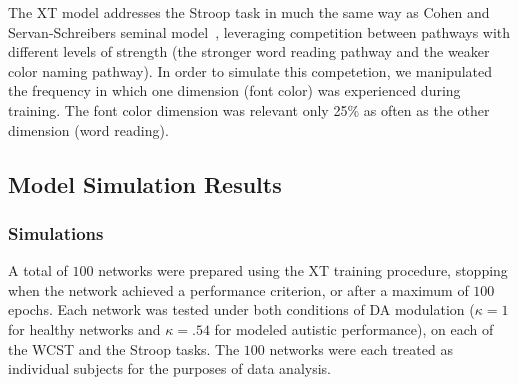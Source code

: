 
The XT model addresses the Stroop task in much the same way as Cohen and Servan-Schreibers seminal model~\cite{CohenJD:1990:Stroop}, leveraging competition between pathways with different levels of strength (the stronger word reading pathway and the weaker color naming pathway).  In order to simulate this competetion, we manipulated the frequency in which one dimension (font color) was experienced during training. The font color dimension was relevant only 25\% as often as the other dimension (word reading).  

\subsection{Model Simulation Results}

\subsubsection{Simulations} 
A total of $100$ networks were prepared using the XT 
training procedure, stopping when the network achieved a
performance criterion, or after a maximum of $100$ epochs.  Each
network was tested under both conditions of DA modulation ($\kappa = 1$ for healthy networks and $\kappa = .54$ for modeled autistic performance), on
each of the WCST and the Stroop tasks.  The $100$ networks were each
treated as individual subjects for the purposes of data analysis.

